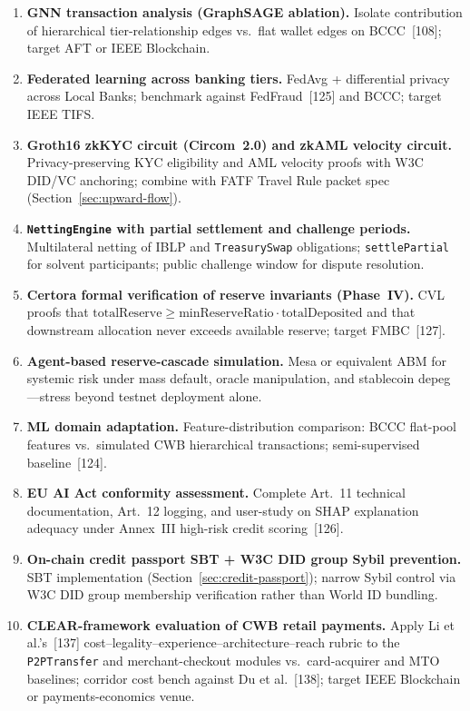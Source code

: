 \documentclass[12pt,a4paper]{report}
\begin{document}
\begin{enumerate}[noitemsep]
\item \textbf{GNN transaction analysis (GraphSAGE ablation).}\label{sec:gnn-extension}
Isolate contribution of hierarchical tier-relationship edges vs.\ flat wallet edges on BCCC~[108]; target AFT or IEEE Blockchain.
\item \textbf{Federated learning across banking tiers.}\label{sec:fl-fraud}
FedAvg + differential privacy across Local Banks; benchmark against FedFraud~[125] and BCCC; target IEEE TIFS.
\item \textbf{Groth16 zkKYC circuit (Circom~2.0) and zkAML velocity circuit.}
Privacy-preserving KYC eligibility and AML velocity proofs with W3C DID/VC anchoring; combine with FATF Travel Rule packet spec (Section~\ref{sec:upward-flow}).
\item \textbf{\texttt{NettingEngine} with partial settlement and challenge periods.}
Multilateral netting of IBLP and \texttt{TreasurySwap} obligations; \texttt{settlePartial} for solvent participants; public challenge window for dispute resolution.
\item \textbf{Certora formal verification of reserve invariants (Phase~IV).}\label{sec:certora}
CVL proofs that \(\mathrm{totalReserve} \ge \mathrm{minReserveRatio} \cdot \mathrm{totalDeposited}\) and that downstream allocation never exceeds available reserve; target FMBC~[127].
\item \textbf{Agent-based reserve-cascade simulation.} Mesa or equivalent ABM for systemic risk under mass default, oracle manipulation, and stablecoin depeg---stress beyond testnet deployment alone.
\item \textbf{ML domain adaptation.} Feature-distribution comparison: BCCC flat-pool features vs.\ simulated CWB hierarchical transactions; semi-supervised baseline~[124].
\item \textbf{EU AI Act conformity assessment.} Complete Art.~11 technical documentation, Art.~12 logging, and user-study on SHAP explanation adequacy under Annex~III high-risk credit scoring~[126].
\item \textbf{On-chain credit passport SBT + W3C DID group Sybil prevention.} SBT implementation (Section~\ref{sec:credit-passport}); narrow Sybil control via W3C DID group membership verification rather than World ID bundling.
\item \textbf{CLEAR-framework evaluation of CWB retail payments.} Apply Li et al.'s~[137] cost--legality--experience--architecture--reach rubric to the \texttt{P2PTransfer} and merchant-checkout modules vs.\ card-acquirer and MTO baselines; corridor cost bench against Du et al.~[138]; target IEEE Blockchain or payments-economics venue.
\end{enumerate}
\end{document}
